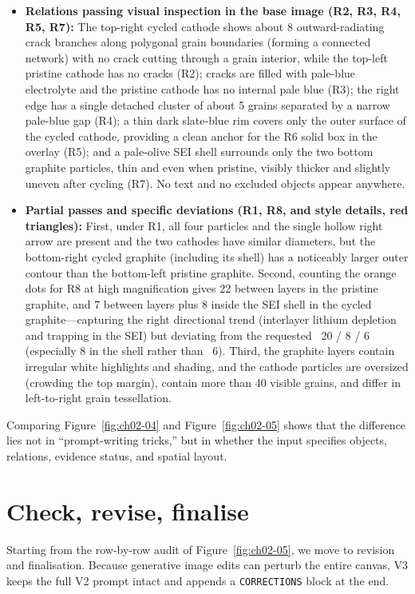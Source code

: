 \begin{itemize}
\item \textbf{Relations passing visual inspection in the base image (R2, R3, R4, R5, R7):} The top-right cycled cathode shows about 8 outward-radiating crack branches along polygonal grain boundaries (forming a connected network) with no crack cutting through a grain interior, while the top-left pristine cathode has no cracks (R2); cracks are filled with pale-blue electrolyte and the pristine cathode has no internal pale blue (R3); the right edge has a single detached cluster of about 5 grains separated by a narrow pale-blue gap (R4); a thin dark slate-blue rim covers only the outer surface of the cycled cathode, providing a clean anchor for the R6 solid box in the overlay (R5); and a pale-olive SEI shell surrounds only the two bottom graphite particles, thin and even when pristine, visibly thicker and slightly uneven after cycling (R7). No text and no excluded objects appear anywhere.
\item \textbf{Partial passes and specific deviations (R1, R8, and style details, red triangles):} First, under R1, all four particles and the single hollow right arrow are present and the two cathodes have similar diameters, but the bottom-right cycled graphite (including its shell) has a noticeably larger outer contour than the bottom-left pristine graphite. Second, counting the orange dots for R8 at high magnification gives 22 between layers in the pristine graphite, and 7 between layers plus 8 inside the SEI shell in the cycled graphite---capturing the right directional trend (interlayer lithium depletion and trapping in the SEI) but deviating from the requested ~20 / 8 / 6 (especially 8 in the shell rather than ~6). Third, the graphite layers contain irregular white highlights and shading, and the cathode particles are oversized (crowding the top margin), contain more than 40 visible grains, and differ in left-to-right grain tessellation.
\end{itemize}

Comparing Figure~\ref{fig:ch02-04} and Figure~\ref{fig:ch02-05} shows that the difference lies not in ``prompt-writing tricks,'' but in whether the input specifies objects, relations, evidence status, and spatial layout.

\section{Check, revise, finalise}

Starting from the row-by-row audit of Figure~\ref{fig:ch02-05}, we move to revision and finalisation. Because generative image edits can perturb the entire canvas, V3 keeps the full V2 prompt intact and appends a \texttt{CORRECTIONS} block at the end.

